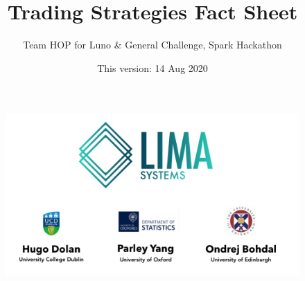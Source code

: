 \documentclass[12pt,a4paper]{article}
\author{%
Team HOP for Luno \& General Challenge, Spark Hackathon }
\title{Trading Strategies Fact Sheet}
\date{This version: 14 Aug 2020}
\begin{document}
\thispagestyle{empty}
\maketitle
\vfill
\begin{figure}[h]
	\centering
	\includegraphics[width=\linewidth]{../Logo}
\end{figure}
\vfill
\tableofcontents
\thispagestyle{empty}
	
	\pagebreak
	
\vfill
\end{document}
